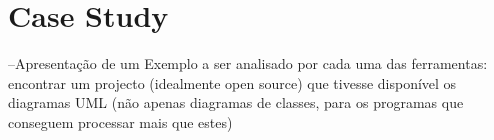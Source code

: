 \section{Case Study}
--Apresentação de um Exemplo a ser analisado por cada uma das ferramentas:
 encontrar um projecto (idealmente open source) que tivesse disponível os diagramas UML (não apenas diagramas de classes, para os programas que conseguem processar mais que estes)

